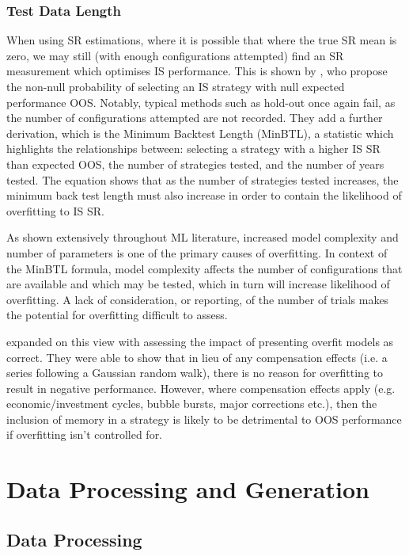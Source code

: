 \documentclass[a4paper,11pt,oneside]{article}
\theoremstyle{plain}
\theoremstyle{definition}
\begin{document}
	\subsubsection{Test Data Length}

	When using SR estimations, where it is possible that where the true SR mean is 
	zero, we may still (with enough configurations attempted) find an SR measurement which optimises IS performance. 
	This is shown by \citet{BaileyBTL}, who propose the non-null probability of selecting an IS strategy with null expected 
	performance OOS. Notably, typical methods such as hold-out once again fail, as the number of configurations 
	attempted are not recorded. They add a further derivation, which is the Minimum Backtest Length (MinBTL), a statistic which highlights the relationships between: selecting a strategy with a higher IS SR than expected OOS, 
	the number of strategies tested, and the number of years tested. The equation shows that  as the number 
	of strategies tested increases, the minimum back test length must also increase in order to contain the likelihood 
	of overfitting to IS SR. 
	\hfill \break 
	
	As shown extensively throughout ML literature, increased model complexity and number of parameters is one of 
	the primary causes of overfitting. In context of the MinBTL formula, model complexity affects the number of 
	configurations that are available and which may be tested, which in turn will increase likelihood of overfitting. 
	A lack of consideration, or reporting, of the number of trials makes the potential for overfitting difficult to assess. 
	\hfill \break 
	
	\citet{BaileyBTL} expanded on this view with assessing the impact of presenting overfit models as correct. 
	They were able to show that in lieu of any compensation effects (i.e. a series following a Gaussian random walk), 
	there is no reason for overfitting to result in negative performance. However, where compensation effects apply 
	(e.g. economic/investment cycles, bubble bursts, major corrections etc.), then the inclusion of memory in a strategy
	is likely to be detrimental to OOS performance if overfitting isn’t controlled for.
	\hfill \break 
	
	\newpage
	
	\section{Data Processing and Generation }\label{Data}
	\subsection{Data Processing}\label{data_processing}
	
\end{document}
